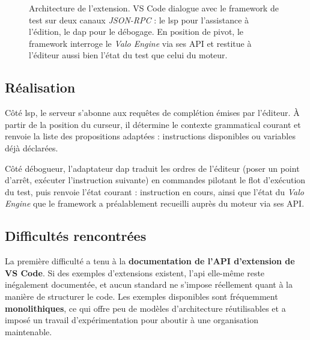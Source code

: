 \begin{figure}[H]
\caption{Architecture de l'extension. VS Code dialogue avec le framework de
test sur deux canaux \emph{JSON-RPC} : le \gls{lsp} pour l'assistance à
l'édition, le \gls{dap} pour le débogage. En position de pivot, le framework
interroge le \emph{Valo Engine} via ses API et restitue à l'éditeur aussi bien
l'état du test que celui du moteur.}
\label{fig:archi-extension}
\end{figure}

\subsection{Réalisation}
Côté \gls{lsp}, le serveur s'abonne aux requêtes de complétion émises par
l'éditeur. À partir de la position du curseur, il détermine le contexte
grammatical courant et renvoie la liste des propositions adaptées :
instructions disponibles ou variables déjà déclarées.

Côté débogueur, l'adaptateur \gls{dap} traduit les ordres de l'éditeur (poser un
point d'arrêt, exécuter l'instruction suivante) en commandes pilotant le flot
d'exécution du test, puis renvoie l'état courant : instruction en cours, ainsi
que l'état du \emph{Valo Engine} que le framework a préalablement recueilli
auprès du moteur via ses API.

\subsection{Difficultés rencontrées}
La première difficulté a tenu à la \textbf{documentation de l'API d'extension de
VS Code}. Si des exemples d'extensions existent, l'\gls{api} elle-même reste
inégalement documentée, et aucun standard ne s'impose réellement quant à la
manière de structurer le code. Les exemples disponibles sont fréquemment
\textbf{monolithiques}, ce qui offre peu de modèles d'architecture réutilisables
et a imposé un travail d'expérimentation pour aboutir à une organisation
maintenable.

